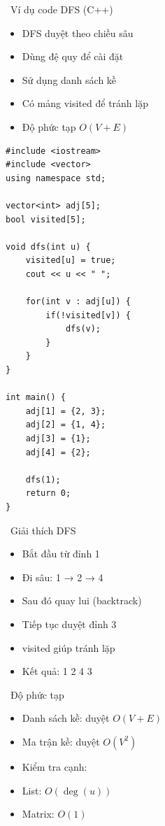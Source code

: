 \documentclass{beamer}
\begin{document}
\begin{frame}{\faCode\ Ví dụ code DFS (C++)}
\begin{tcolorbox}
\begin{itemize}
\item DFS duyệt theo chiều sâu
\item Dùng đệ quy để cài đặt
\item Sử dụng danh sách kề
\item Có mảng visited để tránh lặp
\item Độ phức tạp $O(V + E)$
\end{itemize}
\end{tcolorbox}

\vspace{0.3cm}

\begin{lstlisting}
#include <iostream>
#include <vector>
using namespace std;

vector<int> adj[5];
bool visited[5];

void dfs(int u) {
    visited[u] = true;
    cout << u << " ";

    for(int v : adj[u]) {
        if(!visited[v]) {
            dfs(v);
        }
    }
}

int main() {
    adj[1] = {2, 3};
    adj[2] = {1, 4};
    adj[3] = {1};
    adj[4] = {2};

    dfs(1);
    return 0;
}
\end{lstlisting}

\end{frame}


\begin{frame}{\faLightbulb\ Giải thích DFS}
\begin{tcolorbox}[colframe=softpurple!70!black]
\begin{itemize}
\item Bắt đầu từ đỉnh 1
\item Đi sâu: 1 → 2 → 4
\item Sau đó quay lui (backtrack)
\item Tiếp tục duyệt đỉnh 3
\item visited giúp tránh lặp
\item Kết quả: 1 2 4 3
\end{itemize}
\end{tcolorbox}
\end{frame}
\begin{frame}{\faChartLine\ Độ phức tạp}
\begin{tcolorbox}
\begin{itemize}
\item Danh sách kề: duyệt $O(V+E)$
\item Ma trận kề: duyệt $O(V^2)$
\item Kiểm tra cạnh:
\item List: $O(\deg(u))$
\item Matrix: $O(1)$
\end{itemize}
\end{tcolorbox}
\end{frame}
\end{document}

